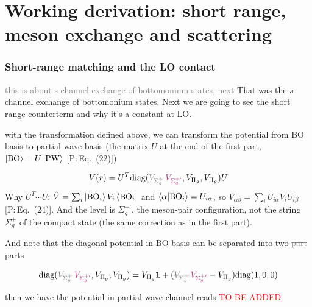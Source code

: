 \documentclass[11pt,a4paper]{article}
\newcommand{\tagP}[1]{\textcolor{blue!65!black}{\textsf{\small[P:\,#1]}}}
\newcommand{\todo}{\textcolor{red}{TO BE ADDED}}
\newcommand{\ai}[1]{\textcolor{aicolor}{#1}}
\newcommand{\aifix}[2]{\textcolor{gray}{\sout{#1}} \textcolor{aicolor}{#2}}
\newcommand{\aifixm}[2]{\textcolor{gray}{\text{\sout{$#1$}}}\,\textcolor{aicolor}{#2}}
\newcommand{\ai}[1]{#1}
\newcommand{\aifix}[2]{#2}
\newcommand{\aifixm}[2]{#2}
\begin{document}
\clearpage
\part{Working derivation: short range, meson exchange and scattering}
\label{part:continuation}
\section{Short-range matching and the LO contact}

\aifix{this is about s-channel exchange of bottomonium states, next}{That was the $s$-channel exchange of bottomonium states. Next} we are going to see the short range counterterm and why it's a constant at LO.

with the transformation defined above, we can transform the potential from BO basis to partial wave basis \ai{(the matrix $U$ at the end of the first part, $\ket{\rm BO}=U\ket{\rm PW}$ \tagP{Eq.~(22)})}

\begin{equation}
	V(r) = U^T \text{diag}(\aifixm{V_{\Sigma_g^+}}{V_{\Sigma_g^{+\prime}}}, V_{\Pi_g}, V_{\Pi_g})U
\end{equation}
\ai{Why $U^T\cdots U$: $\hat V=\sum_i\ket{{\rm BO}_i}V_i\bra{{\rm BO}_i}$ and $\braket{\alpha|{\rm BO}_i}=U_{i\alpha}$, so $V_{\alpha\beta}=\sum_iU_{i\alpha}V_iU_{i\beta}$ \tagP{Eq.~(24)}. And the level is $\Sigma_g^{+\prime}$, the meson-pair configuration, not the string $\Sigma_g^+$ of the compact state (the same correction as in the first part).}

And note that the diagonal potential in BO basis can be separated into two \aifix{part}{parts}

\begin{equation}
	\text{diag}(\aifixm{V_{\Sigma_g^+}}{V_{\Sigma_g^{+\prime}}}, V_{\Pi_g}, V_{\Pi_g}) = V_{\Pi_g} {\bm 1} + (\aifixm{V_{\Sigma_g^+}}{V_{\Sigma_g^{+\prime}}} - V_{\Pi_g}) \text{diag}(1,0,0)
\end{equation}

then we have the potential in partial wave channel reads \aifix{\todo}{}
\end{document}
